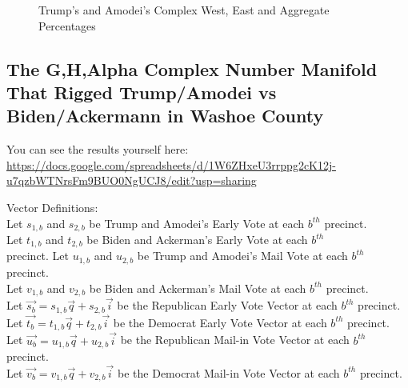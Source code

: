 \documentclass[preprint,13pt]{elsarticle}
\begin{document}
\begin{figure}[bp!]
\begin{center}
\caption{Trump's and Amodei's Complex West, East and Aggregate Percentages}
\noindent{}
\end{center}
\end{figure}
\newpage
\subsection{The G,H,Alpha Complex Number Manifold That Rigged Trump/Amodei vs Biden/Ackermann in Washoe County}

You can see the results yourself here: \url{https://docs.google.com/spreadsheets/d/1W6ZHxeU3rrppg2cK12j-u7qzbWTNrsFm9BUO0NgUCJ8/edit?usp=sharing}

Vector Definitions:\\
Let $s_{1,b}$ and $s_{2,b}$ be Trump and Amodei's Early Vote at each $b^{th}$ precinct.\\
Let $t_{1,b}$ and $t_{2,b}$ be Biden and Ackerman's Early Vote at each $b^{th}$\\ precinct.
Let $u_{1,b}$ and $u_{2,b}$ be Trump and Amodei's Mail Vote at each $b^{th}$ precinct.\\
Let $v_{1,b}$ and $v_{2,b}$ be Biden and Ackerman's Mail Vote at each $b^{th}$ precinct.\\
Let $\vec{s_{b}}=s_{1,b}\vec{q}+s_{2,b}\vec{i}$ be the Republican Early Vote Vector at each $b^{th}$ precinct.\\
Let $\vec{t_{b}}=t_{1,b}\vec{q}+t_{2,b}\vec{i}$ be the Democrat Early Vote Vector at each $b^{th}$ precinct.\\
Let $\vec{u_{b}}=u_{1,b}\vec{q}+u_{2,b}\vec{i}$ be the Republican Mail-in Vote Vector at each $b^{th}$ precinct.\\
Let $\vec{v_{b}}=v_{1,b}\vec{q}+v_{2,b}\vec{i}$ be the Democrat Mail-in Vote Vector at each $b^{th}$ precinct.
\end{document}
